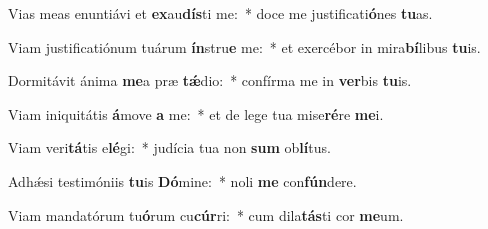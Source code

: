 \item Vias meas enuntiávi et \textbf{ex}au\textbf{dís}ti me:~* doce me justificati\textbf{ó}nes \textbf{tu}as.
\item Viam justificatiónum tuárum \textbf{ín}stru\textbf{e} me:~* et exercébor in mira\textbf{bí}libus \textbf{tu}is.
\item Dormitávit ánima \textbf{me}a præ \textbf{tǽ}dio:~* confírma me in \textbf{ver}bis \textbf{tu}is.
\item Viam iniquitátis \textbf{á}move \textbf{a} me:~* et de lege tua mise\textbf{ré}re \textbf{me}i.
\item Viam veri\textbf{tá}tis e\textbf{lé}gi:~* judícia tua non \textbf{sum} ob\textbf{lí}tus.
\item Adhǽsi testimóniis \textbf{tu}is \textbf{Dó}mine:~* noli \textbf{me} con\textbf{fún}dere.
\item Viam mandatórum tu\textbf{ó}rum cu\textbf{cúr}ri:~* cum dila\textbf{tás}ti cor \textbf{me}um.
